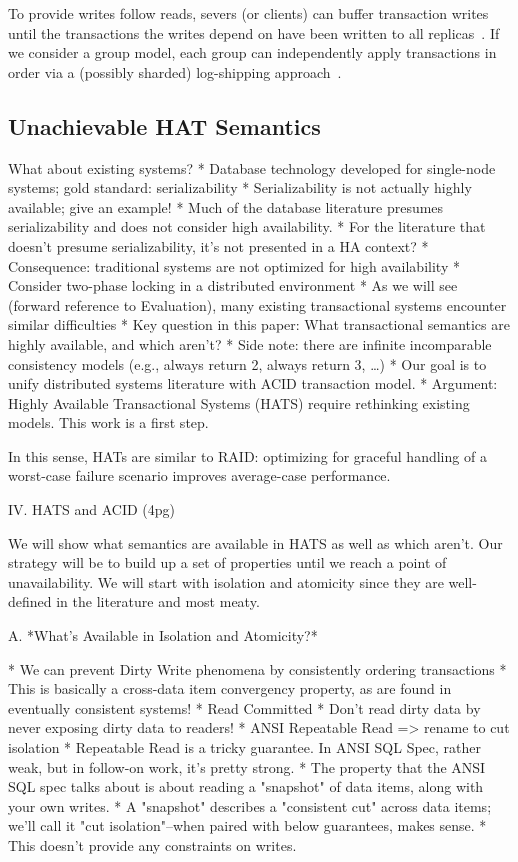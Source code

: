 To provide writes follow reads,
severs (or clients) can buffer transaction writes until the
transactions the writes depend on have been written to all
replicas~\cite{cops}. If we consider a group model, each group can
independently apply transactions in order via a (possibly sharded)
log-shipping approach~\cite{causalmemory, cops, eiger, swift}.



\subsection{Unachievable HAT Semantics}
\label{sec:unachievable-hat}

What about existing systems?
* Database technology developed for single-node systems; gold standard: serializability
	* Serializability is not actually highly available; give an example!
	* Much of the database literature presumes serializability and does not consider high availability.
	* For the literature that doesn't presume serializability, it's not presented in a HA context?
* Consequence: traditional systems are not optimized for high availability
	* Consider two-phase locking in a distributed environment
	* As we will see (forward reference to Evaluation), many existing transactional systems encounter similar difficulties
* Key question in this paper: What transactional semantics are highly available, and which aren't?
	* Side note: there are infinite incomparable consistency models (e.g., always return 2, always return 3, …)
	* Our goal is to unify distributed systems literature with ACID transaction model.
* Argument: Highly Available Transactional Systems (HATS) require rethinking existing models. This work is a first step.

In this sense, HATs are similar to RAID: optimizing for graceful
handling of a worst-case failure scenario improves average-case
performance.

IV. HATS and ACID (4pg)

We will show what semantics are available in HATS as well as which aren't. Our strategy will be to build up a set of properties until we reach a point of unavailability. We will start with isolation and atomicity since they are well-defined in the literature and most meaty.

A. *What's Available in Isolation and Atomicity?*

* We can prevent Dirty Write phenomena by consistently ordering transactions
	* This is basically a cross-data item convergency property, as are found in eventually consistent systems!
* Read Committed
	* Don't read dirty data by never exposing dirty data to readers!
* ANSI Repeatable Read => rename to cut isolation
	* Repeatable Read is a tricky guarantee. In ANSI SQL Spec, rather weak, but in follow-on work, it's pretty strong.
	* The property that the ANSI SQL spec talks about is about reading a "snapshot" of data items, along with your own writes.
		* A "snapshot" describes a "consistent cut" across data items; we'll call it "cut isolation"--when paired with below guarantees, makes sense.
	* This doesn't provide any constraints on writes.

